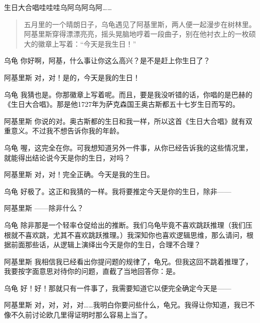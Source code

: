 
\begin{dialog}{生日大合唱哇哇哇乌阿乌阿乌阿……}

\begin{quote}
五月里的一个晴朗日子，乌龟遇见了阿基里斯，两人便一起漫步在树林里。阿基里斯穿得漂漂亮亮，摇头晃脑地哼着一段曲子，别在他衬衣上的一枚硕大的徽章上写着：“今天是我生日！”
\end{quote}

\begin{dialogue}

\item[乌龟]你好啊，阿基，什么事让你这么高兴？是不是赶上你生日了？

\item[阿基里斯]对，对！是的，今天是我的生日！

\item[乌龟]我猜也是。你那徽章上写着呢。而且，要是我没听错的话，你唱的是巴赫的《生日大合唱》。那是他1727年为萨克森国王奥古斯都五十七岁生日而写的。

\item[阿基里斯]你说的对。奥古斯都的生日和我一样，所以这首《生日大合唱》就有双重意义。不过我不想告诉你我的年龄。

\item[乌龟]喔，这完全在你。可我想知道另外一件事，从你已经告诉我的这些情况里，就能得出结论说今天是你的生日，对吗？

\item[阿基里斯]对，对！完全正确。今天是我的生日。

\item[乌龟]好极了。这正和我猜的一样。我将要推定今天是你的生日，除非——

\item[阿基里斯]——除非什么？

\item[乌龟]除非那是一个轻率仓促给出的推断。我们乌龟毕竟不喜欢跳跃推理（我们压根就不喜欢跳，尤其不喜欢跳跃推理。）我深知你也喜欢逻辑思维，那么请问，根据前面那些话，从逻辑上演绎出今天是你的生日，合理不合理？

\item[阿基里斯]我相信我已经看出你提问题的规律了，龟兄。但我这回不跳着推理了，我要按字面意思对待你的问题，直截了当地回答你：是。

\item[乌龟]好！好！那就只有一件事了，我需要知道它以便完全确定今天是——

\item[阿基里斯]对，对，对，对……我明白你要问些什么，龟兄。我得让你知道，我已不像不久前讨论欧几里得证明时那么容易上当了。


\end{dialogue}
\end{dialog}
